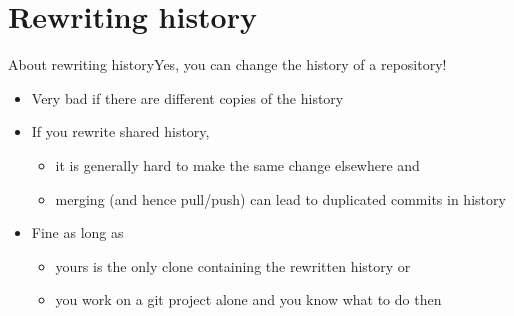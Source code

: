 \documentclass[usenames,svgnames,14pt]{beamer}
\begin{document}
\section{Rewriting history}
\begin{frame}{About rewriting history}{Yes, you can change the history of a repository!}
\begin{overlayarea}{\textwidth}{0.3\textheight}
    \setlength{\leftmargini}{5mm}
    \begin{itemize}
        \item\alert{Very bad if there are different copies of the history} 
        \item If you rewrite shared history,\\
              \begin{itemize}
                  \item it is generally hard to make the same change elsewhere and\\
                  \item merging (and hence pull/push) can lead to duplicated commits in history
              \end{itemize}
        \item<only@1> Fine as long as\\
              \begin{itemize}
                  \item yours is the only clone containing the rewritten history or
                  \item you work on a git project alone and you know what to do then
              \end{itemize}
    \end{itemize}
\end{overlayarea}
    \begin{center}
\end{center}
\end{frame}
\end{document}
